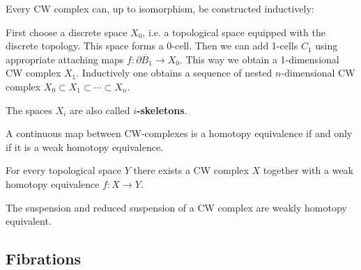     \begin{construct}
        Every CW complex can, up to isomorphism, be constructed inductively:

        \indent First choose a discrete space $X_0$, i.e. a topological space equipped with the discrete topology. This space forms a 0-cell. Then we can add 1-cells $C_1$ using appropriate attaching maps $f:\partial\overline{B}_1\rightarrow X_0$. This way we obtain a 1-dimensional CW complex $X_1$. Inductively one obtains a sequence of nested $n$-dimensional CW complex $X_0\subset X_1\subset\cdots\subset X_n$.

        The spaces $X_i$ are also called \textbf{$i$-skeletons}.
    \end{construct}

    \begin{theorem}[Whitehead]
        A continuous map between CW-complexes is a homotopy equivalence if and only if it is a weak homotopy equivalence.
    \end{theorem}
    \begin{theorem}
        For every topological space $Y$ there exists a CW complex $X$ together with a weak homotopy equivalence $f:X\rightarrow Y$.
    \end{theorem}

    \begin{property}[Suspensions]
        The suspension and reduced suspension of a CW complex are weakly homotopy equivalent.
    \end{property}

\subsection{Fibrations}

